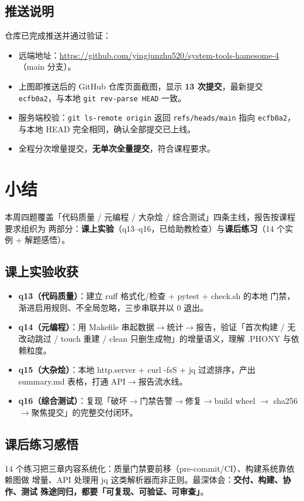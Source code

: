 \documentclass{hamesome-report}
\begin{document}
\subsection{推送说明}
仓库已完成推送并通过验证：
\begin{itemize}
  \item 远端地址：\url{https://github.com/yingjunzhu520/system-tools-hamesome-4}（main 分支）。
  \item 上图即推送后的 GitHub 仓库页面截图，显示 \textbf{13 次提交}，最新提交
        \texttt{ecfb0a2}，与本地 \texttt{git rev-parse HEAD} 一致。
  \item 服务端校验：\texttt{git ls-remote origin} 返回 \texttt{refs/heads/main}
        指向 \texttt{ecfb0a2}，与本地 HEAD 完全相同，确认全部提交已上线。
  \item 全程分次增量提交，\textbf{无单次全量提交}，符合课程要求。
\end{itemize}

\section{小结}
本周四题覆盖「代码质量 / 元编程 / 大杂烩 / 综合测试」四条主线，报告按课程要求组织为
两部分：\textbf{课上实验}（q13–q16，已给助教检查）与\textbf{课后练习}（14 个实例 +
解题感悟）。

\subsection{课上实验收获}
\begin{itemize}
  \item \textbf{q13（代码质量）}：建立 ruff 格式化/检查 + pytest + check.sh 的本地
        门禁，渐进启用规则、不全局忽略，三步串联并以 0 退出。
  \item \textbf{q14（元编程）}：用 Makefile 串起数据$\to$统计$\to$报告，验证「首次构建 /
        无改动跳过 / touch 重建 / clean 只删生成物」的增量语义，理解 .PHONY 与依赖粒度。
  \item \textbf{q15（大杂烩）}：本地 http.server + curl -fsS + jq 过滤排序，产出
        summary.md 表格，打通 API$\to$报告流水线。
  \item \textbf{q16（综合测试）}：复现「破坏$\to$门禁告警$\to$修复$\to$build wheel
        $\to$ sha256$\to$聚焦提交」的完整交付闭环。
\end{itemize}

\subsection{课后练习感悟}
14 个练习把三章内容系统化：质量门禁要前移（pre-commit/CI）、构建系统靠依赖图做
增量、API 处理用 jq 这类解析器而非正则。最深体会：\textbf{交付、构建、协作、测试
殊途同归，都要「可复现、可验证、可审查」}。
\end{document}
